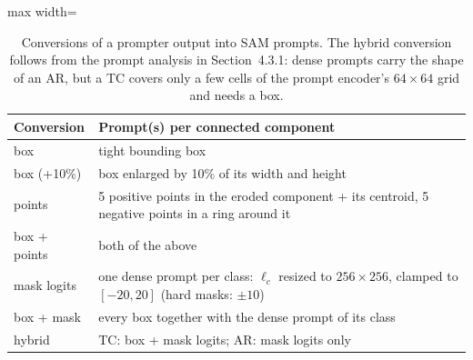 \begin{table}[htbp]
\centering
\small
\begin{adjustbox}{max width=\linewidth}
\begin{tabular}{ll}
\toprule
Conversion & Prompt(s) per connected component \\
\midrule
box & tight bounding box \\
box (+10\%) & box enlarged by 10\% of its width and height \\
points & 5 positive points in the eroded component + its centroid, 5 negative points in a ring around it \\
box + points & both of the above \\
mask logits & one dense prompt per class: $\ell_c$ resized to $256\times256$, clamped to $[-20,20]$ (hard masks: $\pm10$) \\
box + mask & every box together with the dense prompt of its class \\
hybrid & TC: box + mask logits; AR: mask logits only \\
\bottomrule
\end{tabular}
\end{adjustbox}
\caption{Conversions of a prompter output into SAM prompts. The hybrid conversion follows from the prompt analysis in
Section~4.3.1: dense prompts carry the shape of an AR, but a TC covers only a few cells of the prompt encoder's
$64\times64$ grid and needs a box.}
\label{tab:conversions}
\end{table}

